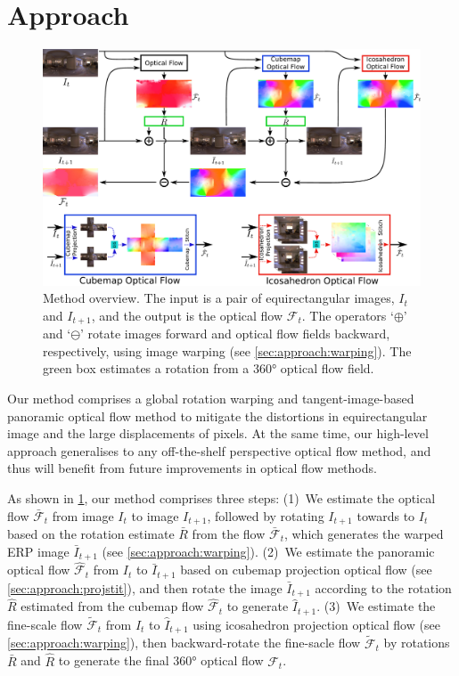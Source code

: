 \section{Approach}
\label{sec:approach}

\begin{figure}%
	\centering
	\includegraphics[width=0.95\linewidth]{images/method_pipeline_1.pdf}
	\caption{Method overview.
		The input is a pair of equirectangular images, $I_t$ and $I_{t+1}$, and the output is the optical flow $\mathcal{F}_t$.
		The operators `$\oplus$' and `$\ominus$' rotate images forward and optical flow fields backward, respectively, using image warping (see \cref{sec:approach:warping}).
		The green box estimates a rotation from a 360° optical flow field.
	}
	\label{fig:approach:pipeline}
\end{figure}

Our method comprises a global rotation warping and tangent-image-based panoramic optical flow method to mitigate the distortions in equirectangular image and the large displacements of pixels.
At the same time, our high-level approach generalises to any off-the-shelf perspective optical flow method, and thus will benefit from future improvements in optical flow methods.


As shown in \cref{fig:approach:pipeline}, our method comprises three steps:
%
(1)~We estimate the optical flow $\bar{\mathcal{F}}_t$ from image $I_{t}$ to image ${I_{t+1}}$, followed by rotating $I_{t+1}$ towards to $I_{t}$ based on the rotation estimate $\bar{R}$ from the flow $\bar{\mathcal{F}}_t$, which generates the warped ERP image ${\bar{I}}_{t+1}$ (see \cref{sec:approach:warping}).
%
(2)~We estimate the panoramic optical flow ${\hat{\mathcal{F}}}_t$ from $I_{t}$ to ${\bar{I}}_{t+1}$ based on cubemap projection optical flow (see \cref{sec:approach:projstit}), and then rotate the image ${\bar{I}}_{t+1}$ according to the rotation $\hat{R}$ estimated from the cubemap flow ${\hat{\mathcal{F}}}_t$ to generate ${\hat{I}}_{t+1}$.
%
(3)~We estimate the fine-scale flow $\tilde{\mathcal{F}}_t$ from $I_{t}$ to ${\hat{I}}_{t+1}$ using icosahedron projection optical flow (see \cref{sec:approach:warping}), then backward-rotate the fine-sacle flow $\tilde{\mathcal{F}}_t$ by rotations $\bar{R}$ and $\hat{R}$ to generate the final 360° optical flow $\mathcal{F}_t$.


